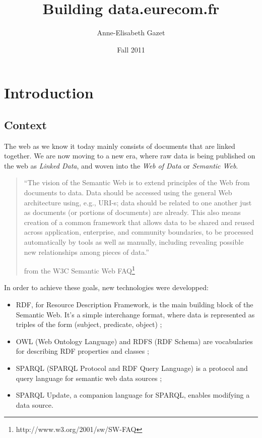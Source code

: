 \documentclass[a4paper,11pt]{report}
\title{Building data.eurecom.fr}
\author{Anne-Elisabeth Gazet}
\date{Fall 2011}
\begin{document}
\maketitle

\chapter*{Introduction}

\section*{Context}
The web as we know it today mainly consists of documents that are linked together. We are now moving to a new era, where raw data is being published on the web as \emph{Linked Data}, and woven into the \emph{Web of Data} or \emph{Semantic Web}. 
\begin{quotation}
``The vision of the Semantic Web is to extend principles of the Web from documents to data. Data should be accessed using the general Web architecture using, e.g., URI-s; data should be related to one another just as documents (or portions of documents) are already. This also means creation of a common framework that allows data to be shared and reused across application, enterprise, and community boundaries, to be processed automatically by tools as well as manually, including revealing possible new relationships among pieces of data.''
\begin{flushright}
from the W3C Semantic Web FAQ\footnote{http://www.w3.org/2001/sw/SW-FAQ}
\end{flushright}
\end{quotation}
In order to achieve these goals, new technologies were developped:
\begin{itemize}
\item RDF, for Resource Description Framework, is the main building block of the Semantic Web. It's a simple interchange format, where data is represented as triples of the form (subject, predicate, object) ;
\item OWL (Web Ontology Language) and RDFS (RDF Schema) are vocabularies for describing RDF properties and classes ;
\item SPARQL (SPARQL Protocol and RDF Query Language) is a protocol and query language for semantic web data sources ;
\item SPARQL Update, a companion language for SPARQL, enables modifying a data source. %
\end{itemize}
%
\end{document}
